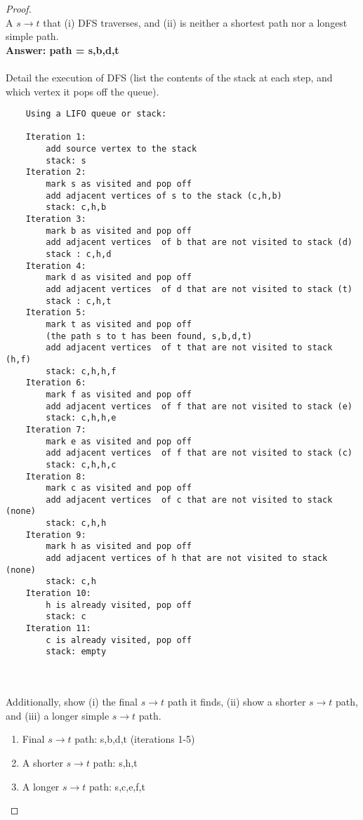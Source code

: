 \documentclass[11pt]{article}
\theoremstyle{definition}
\theoremstyle{definition}
\theoremstyle{definition}
\begin{document}
\begin{proof} $ $\\
A $s \to t$ that (i) DFS traverses, and (ii) is neither a shortest path nor a longest simple path. \\
\textbf{Answer: path = s,b,d,t} \\ \\
Detail the execution of DFS (list the contents of the stack at each step, and which vertex it pops off the queue). 
\begin{verbatim}
    Using a LIFO queue or stack: 
    
    Iteration 1: 
        add source vertex to the stack
        stack: s 
    Iteration 2: 
        mark s as visited and pop off 
        add adjacent vertices of s to the stack (c,h,b) 
        stack: c,h,b
    Iteration 3: 
        mark b as visited and pop off 
        add adjacent vertices  of b that are not visited to stack (d) 
        stack : c,h,d
    Iteration 4: 
        mark d as visited and pop off 
        add adjacent vertices  of d that are not visited to stack (t) 
        stack : c,h,t
    Iteration 5: 
        mark t as visited and pop off 
        (the path s to t has been found, s,b,d,t) 
        add adjacent vertices  of t that are not visited to stack (h,f) 
        stack: c,h,h,f
    Iteration 6: 
        mark f as visited and pop off 
        add adjacent vertices  of f that are not visited to stack (e)
        stack: c,h,h,e
    Iteration 7: 
        mark e as visited and pop off 
        add adjacent vertices  of f that are not visited to stack (c)
        stack: c,h,h,c
    Iteration 8: 
        mark c as visited and pop off 
        add adjacent vertices  of c that are not visited to stack (none)
        stack: c,h,h
    Iteration 9: 
        mark h as visited and pop off 
        add adjacent vertices of h that are not visited to stack (none) 
        stack: c,h
    Iteration 10: 
        h is already visited, pop off 
        stack: c
    Iteration 11: 
        c is already visited, pop off 
        stack: empty 
\end{verbatim}
\\ \\
Additionally, show (i) the final $s \to t$ path it finds, (ii) show a shorter $s \to t$ path, and (iii) a longer simple $s \to t$ path. 
\begin{enumerate}
    \item Final $s \to t $ path: s,b,d,t (iterations 1-5) 
    \item A shorter $s \to t $ path: s,h,t
    \item A longer $s \to t $ path: s,c,e,f,t
\end{enumerate}

\end{proof}




\end{document}
